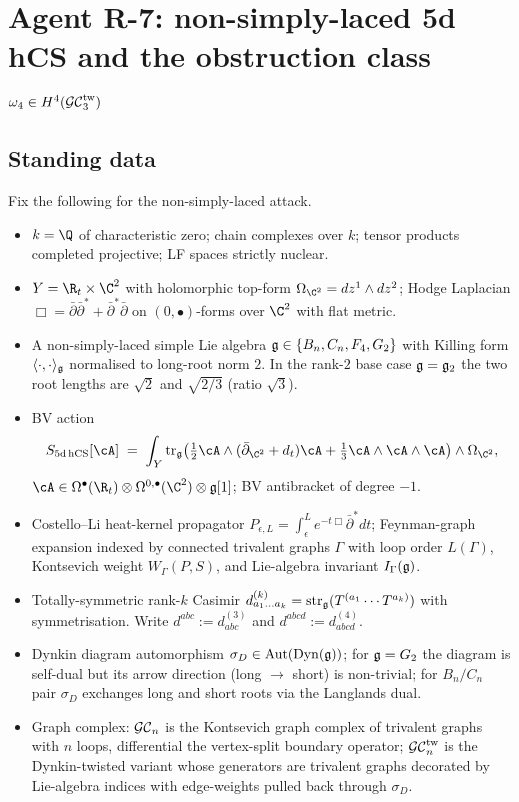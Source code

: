 \chapter*{Agent R-7: non-simply-laced 5d hCS and the obstruction class
\texorpdfstring{$\omega_4 \in H^4(\mathcal{GC}^{\mathrm{tw}}_3)$}{omega-4 in H4(GC-tw-3)}}

\section*{Standing data}

Fix the following for the non-simply-laced attack.
\begin{itemize}
\item $k = \Q$ of characteristic zero; chain complexes over $k$; tensor
products completed projective; LF spaces strictly nuclear.
\item $Y = \R_t \times \C^2$ with holomorphic top-form
$\Omega_{\C^2} = dz^1 \wedge dz^2$; Hodge Laplacian
$\Box = \bar\partial\bar\partial^{*} + \bar\partial^{*}\bar\partial$ on
$(0,\bullet)$-forms over $\C^2$ with flat metric.
\item A non-simply-laced simple Lie algebra $\mathfrak{g} \in \{B_n, C_n,
F_4, G_2\}$ with Killing form $\langle\cdot,\cdot\rangle_{\mathfrak{g}}$ normalised
to long-root norm $2$. In the rank-$2$ base case $\mathfrak{g} = \mathfrak{g}_2$ the two
root lengths are $\sqrt 2$ and $\sqrt{2/3}$ (ratio $\sqrt 3$).
\item BV action
\begin{equation}
\label{eq:r7-hCS-action}
 S_{5\mathrm{d\,hCS}}[\cA]
 \;=\; \int_Y \mathrm{tr}_\fgg
 \bigl( \tfrac{1}{2} \cA \wedge (\bar\partial_{\C^2} + d_t) \cA
 + \tfrac{1}{3} \cA \wedge \cA \wedge \cA \bigr)
 \wedge \Omega_{\C^2},
\end{equation}
$\cA \in \Omega^\bullet(\R_t) \otimes \Omega^{0,\bullet}(\C^2) \otimes
\fgg[1]$; BV antibracket of degree $-1$.
\item Costello--Li heat-kernel propagator
$P_{\epsilon,L} = \int_\epsilon^L e^{-t\Box}\bar\partial^{*} dt$;
Feynman-graph expansion indexed by connected trivalent graphs $\Gamma$
with loop order $L(\Gamma)$, Kontsevich weight $W_\Gamma(P,S)$, and
Lie-algebra invariant $I_\Gamma(\mathfrak{g})$.
\item Totally-symmetric rank-$k$ Casimir
$d^{(k)}_{a_1 \dots a_k} = \mathrm{str}_{\mathfrak{g}}(T^{(a_1} \cdots T^{a_k)})$
with symmetrisation. Write $d^{abc} := d^{(3)}_{abc}$ and
$d^{abcd} := d^{(4)}_{abcd}$.
\item Dynkin diagram automorphism $\sigma_D \in \mathrm{Aut}(\mathrm{Dyn}(\mathfrak{g}))$;
for $\mathfrak{g} = G_2$ the diagram is self-dual but its arrow direction (long
$\to$ short) is non-trivial; for $B_n/C_n$ pair $\sigma_D$ exchanges
long and short roots via the Langlands dual.
\item Graph complex: $\mathcal{GC}_n$ is the Kontsevich graph complex of trivalent
graphs with $n$ loops, differential the vertex-split boundary operator;
$\mathcal{GC}^{\mathrm{tw}}_n$ is the Dynkin-twisted variant whose generators are trivalent
graphs decorated by Lie-algebra indices with edge-weights pulled back
through $\sigma_D$.
\end{itemize}

